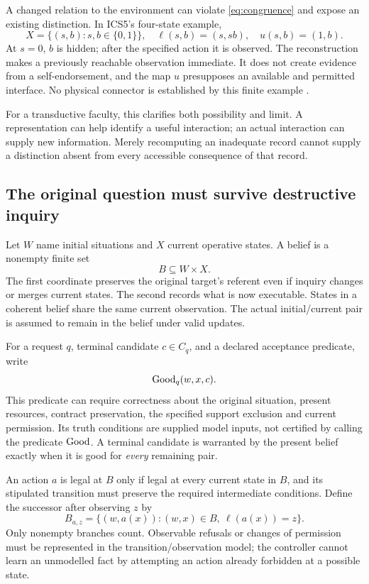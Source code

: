 A changed relation to the environment can violate \eqref{eq:congruence} and expose an existing distinction. In ICS5's four-state example,
\begin{equation}
X=\{(s,b):s,b\in\{0,1\}\},\quad
\ell(s,b)=(s,sb),\quad u(s,b)=(1,b).
\label{eq:reconnect}
\end{equation}
At \(s=0\), \(b\) is hidden; after the specified action it is observed. The reconstruction makes a previously reachable observation immediate. It does not create evidence from a self-endorsement, and the map \(u\) presupposes an available and permitted interface. No physical connector is established by this finite example \cite[\S5.2]{ICS}.

For a transductive faculty, this clarifies both possibility and limit. A representation can help identify a useful interaction; an actual interaction can supply new information. Merely recomputing an inadequate record cannot supply a distinction absent from every accessible consequence of that record.

\subsection{The original question must survive destructive inquiry}

Let \(W\) name initial situations and \(X\) current operative states. A belief is a nonempty finite set
\begin{equation}
B\subseteq W\times X.
\end{equation}
The first coordinate preserves the original target's referent even if inquiry changes or merges current states. The second records what is now executable. States in a coherent belief share the same current observation. The actual initial/current pair is assumed to remain in the belief under valid updates.

For a request \(q\), terminal candidate \(c\in C_q\), and a declared acceptance predicate, write
\begin{equation}
\operatorname{Good}_q(w,x,c).
\label{eq:good}
\end{equation}
This predicate can require correctness about the original situation, present resources, contract preservation, the specified support exclusion and current permission. Its truth conditions are supplied model inputs, not certified by calling the predicate \(\operatorname{Good}\). A terminal candidate is warranted by the present belief exactly when it is good for \emph{every} remaining pair.

An action \(a\) is legal at \(B\) only if legal at every current state in \(B\), and its stipulated transition must preserve the required intermediate conditions. Define the successor after observing \(z\) by
\begin{equation}
B_{a,z}=\{(w,a(x)):(w,x)\in B,\ \ell(a(x))=z\}.
\label{eq:beliefupdate}
\end{equation}
Only nonempty branches count. Observable refusals or changes of permission must be represented in the transition/observation model; the controller cannot learn an unmodelled fact by attempting an action already forbidden at a possible state.

